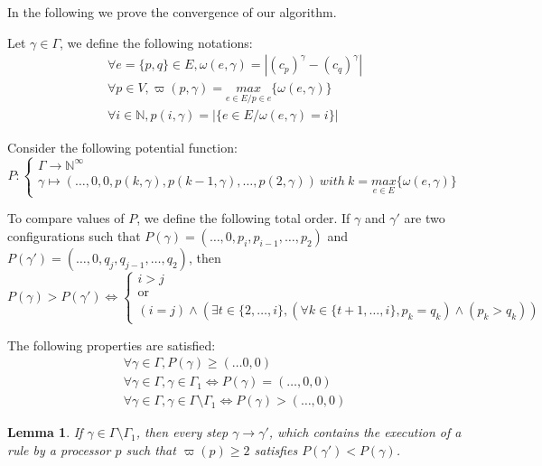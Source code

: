 \documentclass[11pt,english,letterpaper]{article}
\newtheorem{lemma}{Lemma}
\begin{document}
In the following we prove the convergence of our algorithm.

Let $\gamma\in\Gamma$, we define the following notations:
\[\begin{array}{c}\forall e=\{p,q\}\in E, \omega(e,\gamma)=|\left(c_{p}\right)^{\gamma}-\left(c_{q}\right)^{\gamma}|\\
\forall p\in V, \varpi(p,\gamma)=\underset{e\in E/p\in e}{max}\{\omega(e,\gamma)\}\\
\forall i\in\mathbb{N},p(i,\gamma)=|\{e\in E/\omega(e,\gamma)=i\}|\end{array}\]

Consider the following potential function:
\[P : \begin{cases} \Gamma\longrightarrow\mathbb{N}^{\infty}\\
\gamma\longmapsto\left(\ldots,0,0,p(k,\gamma),p(k-1,\gamma),\ldots,p(2,\gamma)\right)\:with\:k=\underset{e\in E}{max}\{\omega(e,\gamma)\}\end{cases}\]

To compare values of $P$, we define the following total order. If $\gamma$ and $\gamma'$ are two configurations such that $P(\gamma)=(\ldots,0,p_i,p_{i-1},\ldots,p_2)$ and $P(\gamma')=(\ldots,0,q_j,q_{j-1},\ldots,q_2)$, then 
\[P(\gamma)>P(\gamma')\Leftrightarrow\begin{cases}
i>j\\
\text{or}\\
(i=j)\wedge(\exists t\in\{2,\ldots,i\}, (\forall k\in\{t+1,\ldots,i\}, p_k=q_k)\wedge(p_k>q_k))
\end{cases}\]

The following properties are satisfied:
\[\begin{array}{c}\forall \gamma\in\Gamma, P(\gamma)\geq(\ldots0,0)\\
\forall \gamma\in\Gamma, \gamma\in\Gamma_{1}\Leftrightarrow P(\gamma)=(\ldots,0,0)\\
\forall \gamma\in\Gamma, \gamma\in\Gamma\setminus\Gamma_{1}\Leftrightarrow P(\gamma)>(\ldots,0,0)\end{array}\]

\begin{lemma}\label{lem:prelem1ConvergenceChaine}
If $\gamma\in\Gamma\setminus\Gamma_{1}$, then every step $\gamma\rightarrow\gamma'$, which contains the execution of a rule by a processor $p$ such that $\varpi(p)\geq 2$ satisfies $P(\gamma')<P(\gamma)$.
\end{lemma}
\end{document}
